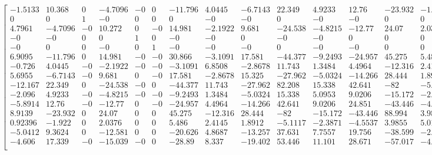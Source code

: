\begin{tiny}
\[\begin{bmatrix}
-1.5133 & 10.368 &     0 & -4.7096 &    -0 &     0 & -11.796 & 4.0445 & -6.7143 & 22.349 & 4.9233 & 12.76 & -23.932 & -1.922 & 9.3624 & 17.339 \\
    0 &     0 &     1 &    -0 &     0 &     0 &     0 &    -0 &    -0 &     0 &    -0 &    -0 &     0 &     0 &     0 &    -0 \\
4.7961 & -4.7096 &    -0 & 10.272 &     0 &    -0 & 14.981 & -2.1922 & 9.681 & -24.538 & -4.8215 & -12.77 & 24.07 & 2.0376 & -12.581 & -15.039 \\
   -0 &    -0 &     0 &     0 &     1 &     0 &    -0 &    -0 &     0 &    -0 &    -0 &     0 &     0 &     0 &     0 &    -0 \\
   -0 &     0 &     0 &    -0 &     0 &     1 &    -0 &    -0 &    -0 &     0 &    -0 &    -0 &     0 &     0 &     0 &     0 \\
6.9095 & -11.796 &     0 & 14.981 &    -0 &    -0 & 30.866 & -3.1091 & 17.581 & -44.377 & -9.2493 & -24.957 & 45.275 & 5.486 & -20.626 & -28.89 \\
-0.726 & 4.0445 &    -0 & -2.1922 &    -0 &    -0 & -3.1091 & 6.8508 & -2.8678 & 11.743 & 1.3484 & 4.4964 & -12.316 & 2.4145 & 4.8687 & 8.337 \\
5.6955 & -6.7143 &    -0 & 9.681 &     0 &    -0 & 17.581 & -2.8678 & 15.325 & -27.962 & -5.0324 & -14.266 & 28.444 & 1.8912 & -13.257 & -19.402 \\
-12.167 & 22.349 &     0 & -24.538 &    -0 &     0 & -44.377 & 11.743 & -27.962 & 82.208 & 15.338 & 42.641 &   -82 & -5.1117 & 37.631 & 53.446 \\
-2.096 & 4.9233 &    -0 & -4.8215 &    -0 &    -0 & -9.2493 & 1.3484 & -5.0324 & 15.338 & 5.0953 & 9.0206 & -15.172 & -2.3871 & 7.7557 & 11.101 \\
-5.8914 & 12.76 &    -0 & -12.77 &     0 &    -0 & -24.957 & 4.4964 & -14.266 & 42.641 & 9.0206 & 24.851 & -43.446 & -4.5537 & 19.756 & 28.671 \\
8.9139 & -23.932 &     0 & 24.07 &     0 &     0 & 45.275 & -12.316 & 28.444 &   -82 & -15.172 & -43.446 & 88.994 & 3.9855 & -38.599 & -57.017 \\
0.92396 & -1.922 &     0 & 2.0376 &     0 &     0 & 5.486 & 2.4145 & 1.8912 & -5.1117 & -2.3871 & -4.5537 & 3.9855 & 5.0113 & -2.6945 & -4.0802 \\
-5.0412 & 9.3624 &     0 & -12.581 &     0 &     0 & -20.626 & 4.8687 & -13.257 & 37.631 & 7.7557 & 19.756 & -38.599 & -2.6945 & 20.632 & 26.192 \\
-4.606 & 17.339 &    -0 & -15.039 &    -0 &     0 & -28.89 & 8.337 & -19.402 & 53.446 & 11.101 & 28.671 & -57.017 & -4.0802 & 26.192 & 42.701 \\
\end{bmatrix}
\]
\end{tiny}
